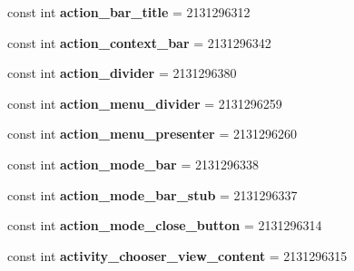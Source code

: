 \begin{DoxyCompactItemize}
\item 
\hypertarget{classClient_1_1Droid_1_1Resource_1_1Id_a3df19fa63d2c951bed72dd4a322bad97}{}const int {\bfseries action\+\_\+bar\+\_\+title} = 2131296312\label{classClient_1_1Droid_1_1Resource_1_1Id_a3df19fa63d2c951bed72dd4a322bad97}

\item 
\hypertarget{classClient_1_1Droid_1_1Resource_1_1Id_ad6239c17b1cd64fd86bb6b48faba3eff}{}const int {\bfseries action\+\_\+context\+\_\+bar} = 2131296342\label{classClient_1_1Droid_1_1Resource_1_1Id_ad6239c17b1cd64fd86bb6b48faba3eff}

\item 
\hypertarget{classClient_1_1Droid_1_1Resource_1_1Id_a01ceb520fbdb25673976967fbd668d23}{}const int {\bfseries action\+\_\+divider} = 2131296380\label{classClient_1_1Droid_1_1Resource_1_1Id_a01ceb520fbdb25673976967fbd668d23}

\item 
\hypertarget{classClient_1_1Droid_1_1Resource_1_1Id_ad8af00473227d79958b069df09feeb2a}{}const int {\bfseries action\+\_\+menu\+\_\+divider} = 2131296259\label{classClient_1_1Droid_1_1Resource_1_1Id_ad8af00473227d79958b069df09feeb2a}

\item 
\hypertarget{classClient_1_1Droid_1_1Resource_1_1Id_a386e89594c3c4583a7aa21b73fdaa3a7}{}const int {\bfseries action\+\_\+menu\+\_\+presenter} = 2131296260\label{classClient_1_1Droid_1_1Resource_1_1Id_a386e89594c3c4583a7aa21b73fdaa3a7}

\item 
\hypertarget{classClient_1_1Droid_1_1Resource_1_1Id_ad67742fd0acd3f5363f61fd593d1ea50}{}const int {\bfseries action\+\_\+mode\+\_\+bar} = 2131296338\label{classClient_1_1Droid_1_1Resource_1_1Id_ad67742fd0acd3f5363f61fd593d1ea50}

\item 
\hypertarget{classClient_1_1Droid_1_1Resource_1_1Id_a096147d27b98529e9e0caf20d8265d30}{}const int {\bfseries action\+\_\+mode\+\_\+bar\+\_\+stub} = 2131296337\label{classClient_1_1Droid_1_1Resource_1_1Id_a096147d27b98529e9e0caf20d8265d30}

\item 
\hypertarget{classClient_1_1Droid_1_1Resource_1_1Id_a545d3acdcdec9661c24212e16db5a9a7}{}const int {\bfseries action\+\_\+mode\+\_\+close\+\_\+button} = 2131296314\label{classClient_1_1Droid_1_1Resource_1_1Id_a545d3acdcdec9661c24212e16db5a9a7}

\item 
\hypertarget{classClient_1_1Droid_1_1Resource_1_1Id_a6708b3804a2c6f6a8a6fa8f69e0279f7}{}const int {\bfseries activity\+\_\+chooser\+\_\+view\+\_\+content} = 2131296315\label{classClient_1_1Droid_1_1Resource_1_1Id_a6708b3804a2c6f6a8a6fa8f69e0279f7}


\end{DoxyCompactItemize}
